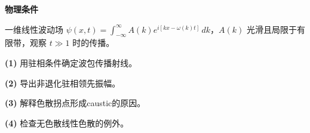 \textbf{物理条件}\par 一维线性波动场 \(\psi(x,t)=\int_{-\infty}^\infty A(k)e^{i[kx-\omega(k)t]}\,dk\)，\(A(k)\) 光滑且局限于有限带，观察 \(t\gg1\) 时的传播。
\par\noindent\textbf{(1)} 用驻相条件确定波包传播射线。
\par\noindent\textbf{(2)} 导出非退化驻相领先振幅。
\par\noindent\textbf{(3)} 解释色散拐点形成caustic的原因。
\par\noindent\textbf{(4)} 检查无色散线性色散的例外。

